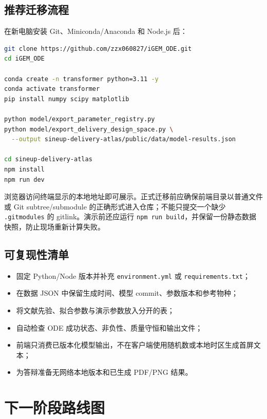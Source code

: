 \documentclass[UTF8,11pt,a4paper]{ctexart}
\newcommand{\code}[1]{\texttt{#1}}
\begin{document}
\subsection{推荐迁移流程}
在新电脑安装 Git、Miniconda/Anaconda 和 Node.js 后：
\begin{lstlisting}[language=bash]
git clone https://github.com/zzx060827/iGEM_ODE.git
cd iGEM_ODE

conda create -n transformer python=3.11 -y
conda activate transformer
pip install numpy scipy matplotlib

python model/export_parameter_registry.py
python model/export_delivery_design_space.py \
  --output sineup-delivery-atlas/public/data/model-results.json

cd sineup-delivery-atlas
npm install
npm run dev
\end{lstlisting}
浏览器访问终端显示的本地地址即可展示。正式迁移前应确保前端目录以普通文件或 Git subtree/submodule 的正确形式进入仓库；不能只提交一个缺少 \code{.gitmodules} 的 gitlink。演示前还应运行 \code{npm run build}，并保留一份静态数据快照，防止现场重新计算失败。

\subsection{可复现性清单}
\begin{itemize}
  \item 固定 Python/Node 版本并补充 \code{environment.yml} 或 \code{requirements.txt}；
  \item 在数据 JSON 中保留生成时间、模型 commit、参数版本和参考物种；
  \item 将文献先验、拟合参数与演示参数放入分开的表；
  \item 自动检查 ODE 成功状态、非负性、质量守恒和输出文件；
  \item 前端只消费已版本化模型输出，不在客户端使用随机数或本地时区生成首屏文本；
  \item 为答辩准备无网络本地版本和已生成 PDF/PNG 结果。
\end{itemize}

\section{下一阶段路线图}
\end{document}
